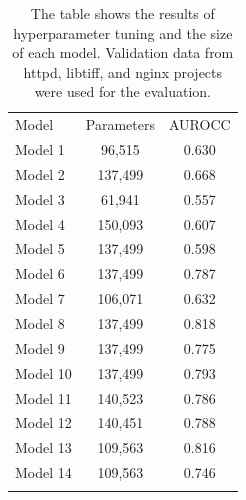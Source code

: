 \begin{table}
    \centering
    \caption{The table shows the results of hyperparameter tuning and the size of each model. Validation data from httpd, libtiff, and nginx projects were used for the evaluation.}
    \vskip6pt
	\begin{tabular}{
        !{\vrule width 1pt}l!{\vrule width 1pt}c|c!{\vrule width 1pt}}
        Model & Parameters & AUROCC \\
        Model 1& 96,515  & 0.630 \\
        Model 2& 137,499  & 0.668 \\
        Model 3& 61,941 & 0.557 \\
        Model 4& 150,093 & 0.607 \\
        Model 5& 137,499 & 0.598 \\
        Model 6& 137,499  & 0.787 \\
        Model 7& 106,071  & 0.632 \\
         Model 8& 137,499  & 0.818 \\
        Model 9& 137,499  & 0.775 \\
         Model 10& 137,499 & 0.793 \\
        Model 11& 140,523  & 0.786 \\
        Model 12& 140,451  & 0.788 \\
         Model 13& 109,563  & 0.816 \\
        Model 14& 109,563  & 0.746 \\
    \end{tabular}
    \label{tab:tuning}
\end{table}


